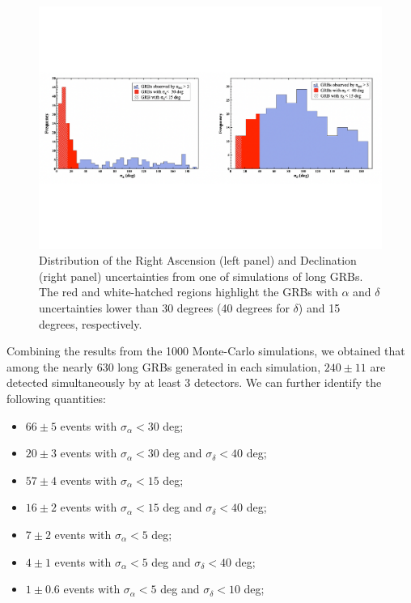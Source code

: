 \documentclass[]{spie}  %
\begin{document}
\begin{figure}[h!]
\centering
\includegraphics[scale=0.45,angle=0]{res_long_pos}
\vspace{-2.5cm}
\caption{Distribution of the Right Ascension (left panel) and Declination (right panel) uncertainties from one of simulations of long GRBs. The red and white-hatched regions highlight the GRBs with $\alpha$ and $\delta$ uncertainties lower than 30 degrees (40 degrees for $\delta$) and 15 degrees, respectively.} 
\label{fig:res_long}
\end{figure}

Combining the results from the 1000 Monte-Carlo simulations, we obtained that among the nearly 630 long GRBs generated in each simulation, $240\pm11$ are detected simultaneously by at least 3 detectors. We can further identify the following quantities:
\begin{itemize}
\item $66\pm5$ events with $\sigma_\alpha < 30$ deg;
\item	$20\pm3$ events with $\sigma_\alpha < 30$ deg and $\sigma_\delta < 40$ deg;
\item	$57\pm4$ events with $\sigma_\alpha < 15$ deg;
\item	$16\pm2$ events with $\sigma_\alpha < 15$ deg and $\sigma_\delta < 40$ deg;
\item	$7\pm2$ events with $\sigma_\alpha < 5$ deg;
\item	$4\pm1$ events with $\sigma_\alpha < 5$ deg and $\sigma_\delta < 40$ deg;
\item	$1\pm0.6$ events with $\sigma_\alpha < 5$ deg and $\sigma_\delta < 10$ deg;
\end{itemize}
\end{document}
